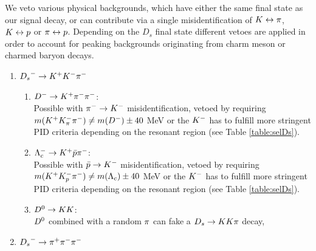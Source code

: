 We veto various physical backgrounds, which have either the same final state as our signal decay, or can contribute via a single misidentification of ${K} \leftrightarrow {\ensuremath{\pi}}$, ${K}\leftrightarrow{\ensuremath{p}}$ or $\pi \leftrightarrow{\ensuremath{p}}$. 
Depending on the $D_s$ final state different vetoes are applied in order to account for peaking backgrounds originating from charm meson or charmed baryon decays.
\begin{enumerate}

\item ${{D}_{s}}^-\rightarrow{\ensuremath{K}}^+{K}^-{\pi}^-$

\begin{enumerate}
	\item ${{D}^-} \rightarrow{\ensuremath{{K}^+}}{\ensuremath{{\pi}^-}}{\ensuremath{{\pi}^-}}$: \\
	Possible with ${{\pi}^-}\rightarrow{\ensuremath{{K}^-}}$ misidentification, vetoed by requiring 
	$m({{K}^+} K^-_\pi {\ensuremath{{\pi}^-}}) \ne m(D^-) \pm 40$ MeV 
	or the ${{K}^-}$ has to fulfill more stringent PID criteria depending on the resonant region (see Table  \ref{table:selDs}).
	
	\item $\Lambda_c^- \rightarrow {\ensuremath{{K}^+}} \bar p {{\pi}^-} $:  \\
	Possible with $\bar p \rightarrow{\ensuremath{{K}^-}}$ misidentification, vetoed by requiring
	$m({{K}^+} K^-_p {{\pi}^-}) \ne m(\Lambda_c) \pm 40$ MeV
	or the ${{K}^-}$ has to fulfill more stringent PID criteria depending on the resonant region (see Table  \ref{table:selDs}).
	
	\item ${{D}^0}\rightarrow{\ensuremath{K}}{\ensuremath{K}}$: \\
	${{D}^0}$ combined with a random ${\pi}$ can fake a ${{D}_{s}}\rightarrow{\ensuremath{K}}{\ensuremath{K}}{\ensuremath{\pi}}$ decay, 
\end{enumerate}

\item ${{D}_{s}}^-\rightarrow{\ensuremath{\pi}}^+{\pi}^-{\pi}^-$

\begin{enumerate}




\end{enumerate}
\end{enumerate}
